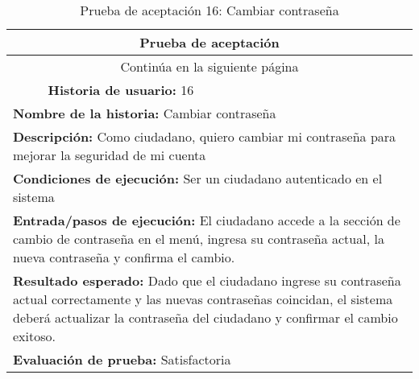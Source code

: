 \begin{longtable}{|p{6.7cm}|p{6.7cm}|}
    \caption{Prueba de aceptación 16: Cambiar contraseña} \label{tab:prueba-16}                                                                                                                                                                             \\
    \hline
    \multicolumn{2}{|c|}{\textbf{Prueba de aceptación}}                                                                                                                                                                                                     \\
    \hline
    \endfirsthead
    \hline
    \endhead
    \hline
    \multicolumn{2}{|c|}{{Continúa en la siguiente página}}                                                                                                                                                                                                 \\
    \hline
    \endfoot
    \hline
    \endlastfoot
    \multicolumn{1}{|p{6.7cm}|}{\textbf{Número} 16} & \multicolumn{1}{|p{6.7cm}|}{\textbf{Historia de usuario:} 16}                                                                                                                                         \\
    \hline
    \multicolumn{2}{|p{13.4cm}|}{\textbf{Nombre de la historia:} Cambiar contraseña}                                                                                                                                                                        \\
    \hline
    \multicolumn{2}{|p{13.4cm}|}{\textbf{Descripción:} Como ciudadano, quiero cambiar mi contraseña para mejorar la seguridad de mi cuenta}                                                                                                                 \\
    \hline
    \multicolumn{2}{|p{13.4cm}|}{\textbf{Condiciones de ejecución:} Ser un ciudadano autenticado en el sistema}                                                                                                                                             \\
    \hline
    \multicolumn{2}{|p{13.4cm}|}{\textbf{Entrada/pasos de ejecución:} El ciudadano accede a la sección de cambio de contraseña en el menú, ingresa su contraseña actual, la nueva contraseña y confirma el cambio.}                                         \\
    \hline
    \multicolumn{2}{|p{13.4cm}|}{\textbf{Resultado esperado:} Dado que el ciudadano ingrese su contraseña actual correctamente y las nuevas contraseñas coincidan, el sistema deberá actualizar la contraseña del ciudadano y confirmar el cambio exitoso.} \\
    \hline
    \multicolumn{2}{|p{13.4cm}|}{\textbf{Evaluación de prueba:} Satisfactoria}                                                                                                                                                                              \\
    \hline
\end{longtable}


